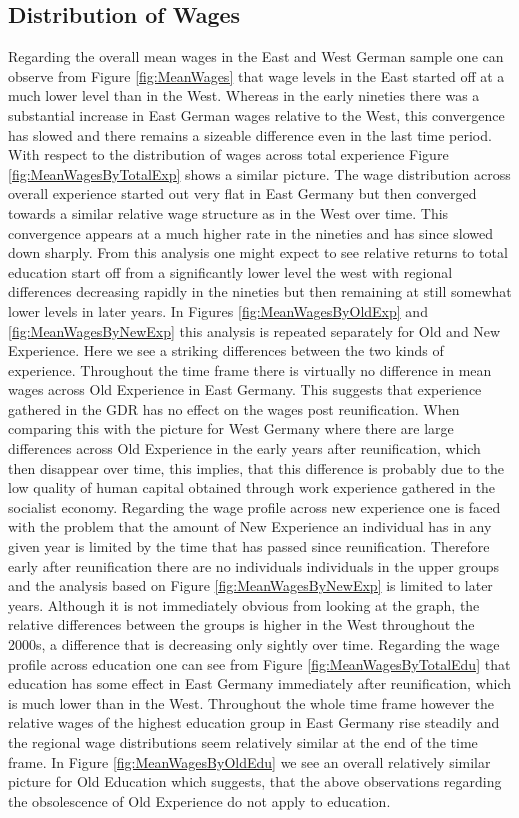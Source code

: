 \subsection{Distribution of Wages}
Regarding the overall mean wages in  the East and West German sample one can observe from Figure \ref{fig:MeanWages} that wage levels in the East  started off at a much lower level than in the West. Whereas in the early nineties there was a substantial increase in East German wages relative to the West, this convergence has slowed and there remains a sizeable difference even in the last time period. 
With respect to the distribution of wages across total experience Figure \ref{fig:MeanWagesByTotalExp} shows a similar picture. The wage distribution across overall experience started out very flat in East Germany but then converged towards a similar relative wage structure as in the West over time. This convergence appears at a much higher rate in the nineties and has since slowed down sharply. From this analysis one might expect to see relative returns to total education start off from a significantly lower level the west with regional differences decreasing rapidly in the nineties but then remaining at still somewhat lower levels in later years.
In Figures \ref{fig:MeanWagesByOldExp} and \ref{fig:MeanWagesByNewExp} this analysis is repeated separately for Old and New Experience. Here we see a striking differences between the two kinds of experience. Throughout the time frame there is virtually no difference in mean wages across Old Experience in East Germany. This suggests that experience gathered in the GDR has no effect on the wages post reunification. When comparing this with the picture for West Germany where there are large differences across Old Experience in the early years after reunification, which then disappear over time, this implies, that this difference is probably due to the low quality of human capital obtained through work experience gathered in the socialist economy. Regarding the wage profile across new experience one is faced with the problem that the amount of New Experience an individual has in any given year is limited by the time that has passed since reunification. Therefore early after reunification there are no individuals individuals in the upper groups and the analysis based on Figure \ref{fig:MeanWagesByNewExp} is limited to later years. Although it is not immediately obvious from looking at the graph, the relative differences between the groups is higher in the West throughout the 2000s, a difference that is decreasing only sightly over time.
Regarding the wage profile across education one can see from Figure \ref{fig:MeanWagesByTotalEdu} that education has some effect in East Germany immediately after reunification, which is much lower than in the West. Throughout the whole time frame however the relative wages of the highest education group in East Germany rise steadily and the regional wage distributions seem relatively similar at the end of the time frame. In Figure \ref{fig:MeanWagesByOldEdu} we see an overall relatively similar picture for Old Education which suggests, that the above observations regarding the obsolescence of Old Experience do not apply to education.

